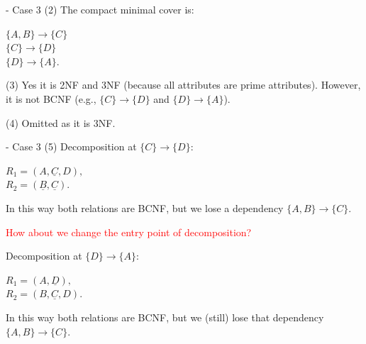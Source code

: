 \begin{frame}[fragile]{ - Case 3}
	(2) The compact minimal cover is:\\\vspace{5pt}
	
	$\{A, B\} \rightarrow \{C\}$\\
	$\{C\} \rightarrow \{D\}$\\
	$\{D\} \rightarrow \{A\}$.\\\vspace{5pt}
	
	(3) Yes it is 2NF and 3NF (because all attributes are prime attributes). However, it is not BCNF (e.g., $\{C\} \rightarrow \{D\}$ and $\{D\} \rightarrow \{A\}$).\\\vspace{5pt}
	
	(4) Omitted as it is 3NF. \\\vspace{5pt}
	
\end{frame}

\begin{frame}[fragile]{ - Case 3}
	(5) Decomposition at $\{C\} \rightarrow \{D\}$:\\\vspace{5pt}
	
	$R_1 = (A, \underline{C}, D),$\\
	$R_2 = (\underline{B}, \underline{C}).$\\\vspace{5pt}
	
	In this way both relations are BCNF, but we lose a dependency $\{A, B\} \rightarrow \{C\}$.\\\vspace{5pt}
	
	\textcolor{red}{How about we change the entry point of decomposition?}\\\vspace{5pt}
	
	Decomposition at $\{D\} \rightarrow \{A\}$:\\\vspace{5pt}
	
	$R_1 = (A, \underline{D}),$\\
	$R_2 = (B, \underline{C}, D).$\\\vspace{5pt}
	
	In this way both relations are BCNF, but we (still) lose that dependency $\{A, B\} \rightarrow \{C\}$.
\end{frame}

